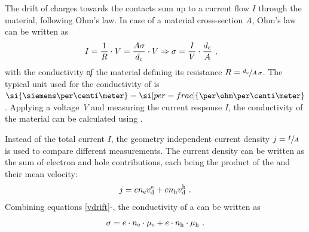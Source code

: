 The drift of charges towards the contacts sum up to a current flow $I$ through the material, following Ohm's%
law. In case of a material cross-section $A$, Ohm's law can be written as
\begin{align}
I&=\frac{1}{R}\cdot V = \frac{A \c}{\dc}\cdot V \Rightarrow \c = \frac{I}{V} \cdot \frac{d_\text{c}}{A}
\label{eq:Cond-I-V-geo}
\KOMMA
\end{align}
with the conductivity \c of the material defining its resistance $R=\sfrac{d_\text{c}}{A \, \c}$. The typical unit used for the conductivity of \SCs is $\si{\siemens\per\centi\meter} = \si[per=frac]{\per\ohm\per\centi\meter}$. Applying a voltage~$V$ and measuring the current response $I$, the conductivity of the material can be calculated using \lasteqn.

Instead of the total current $I$, the geometry independent current density $j=\sfrac{I}{A}$ is used to compare different measurements.
The current density can be written as the sum of electron and hole contributions, each being the product of the \nLong and their mean velocity:
\begin{equation}
 j = e n_\text{e} v_\text{d}^\text{e} + e n_\text{h} v_\text{d}^\text{h}
~.
\end{equation}
Combining equations \eqref{vdrift}-\lasteq, the conductivity of a \SC can be written as
\begin{equation} \label{eq:Cond-CCD-Mob}
 \c = e \cdot \ne \cdot \mobe  + e \cdot \nh \cdot \mobh
\PUNKT
\end{equation}

